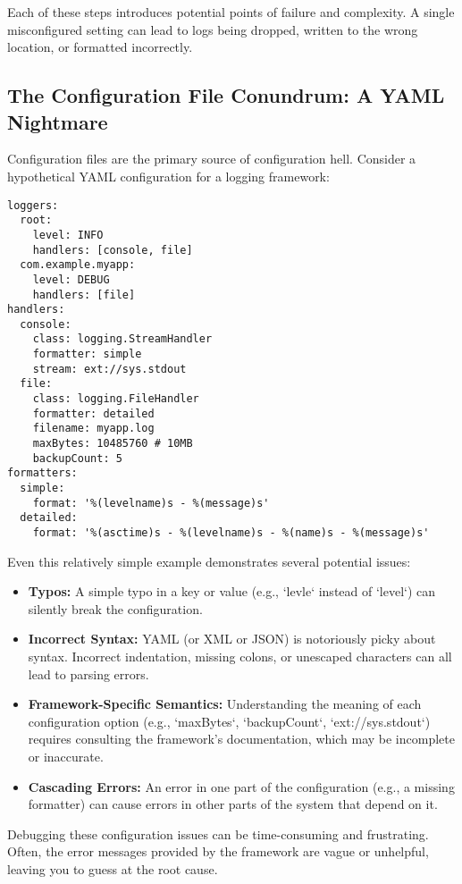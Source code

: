 \documentclass{article}
\begin{document}
{{{{Each of these steps introduces potential points of failure and complexity. A single misconfigured setting can lead to logs being dropped, written to the wrong location, or formatted incorrectly.

\subsection*{The Configuration File Conundrum: A YAML Nightmare}

Configuration files are the primary source of configuration hell.  Consider a hypothetical YAML configuration for a logging framework:

\begin{verbatim}
loggers:
  root:
    level: INFO
    handlers: [console, file]
  com.example.myapp:
    level: DEBUG
    handlers: [file]
handlers:
  console:
    class: logging.StreamHandler
    formatter: simple
    stream: ext://sys.stdout
  file:
    class: logging.FileHandler
    formatter: detailed
    filename: myapp.log
    maxBytes: 10485760 # 10MB
    backupCount: 5
formatters:
  simple:
    format: '%(levelname)s - %(message)s'
  detailed:
    format: '%(asctime)s - %(levelname)s - %(name)s - %(message)s'
\end{verbatim}

Even this relatively simple example demonstrates several potential issues:

\begin{itemize}
    \item \textbf{Typos:} A simple typo in a key or value (e.g., `levle` instead of `level`) can silently break the configuration.
    \item \textbf{Incorrect Syntax:} YAML (or XML or JSON) is notoriously picky about syntax.  Incorrect indentation, missing colons, or unescaped characters can all lead to parsing errors.
    \item \textbf{Framework-Specific Semantics:} Understanding the meaning of each configuration option (e.g., `maxBytes`, `backupCount`, `ext://sys.stdout`) requires consulting the framework's documentation, which may be incomplete or inaccurate.
    \item \textbf{Cascading Errors:}  An error in one part of the configuration (e.g., a missing formatter) can cause errors in other parts of the system that depend on it.
\end{itemize}

Debugging these configuration issues can be time-consuming and frustrating.  Often, the error messages provided by the framework are vague or unhelpful, leaving you to guess at the root cause.

}}}}
\end{document}
